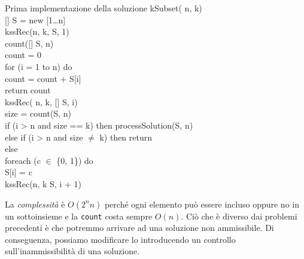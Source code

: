 \begin{minicode}{Prima implementazione della soluzione}
\ind kSubset( n,  k)\\
    [] S = new [1\dots n]\\
    kssRec(n, k, S, 1)\\

\noindent{}
\rmindent\ind{} count([] S,  n)\\
     count = 0\\
    \indf for (i = 1 to n) do\\
        count = count + S[i]\\
    \indf return count\\

\ind kssRec( n,  k, [] S,  i)\\
     size = count(S, n)\\
    \indf if (i > n and size == k) then\hfill{}
        processSolution(S, n)\\
    \indf else if (i > n and size $\neq$ k) then\hfill{}
        return\\
    \indf else\\
        \indff foreach (c $\in$ \{0, 1\}) do\\
            S[i] = c\\
            kssRec(n, k S, i + 1)
\end{minicode}

\noindent
La \emph{complessità} è $O(2^nn)$ perché ogni elemento può essere incluso oppure
no in un sottoinsieme e la \texttt{count} costa sempre $O(n)$. Ciò che è
diverso dai problemi precedenti è che potremmo arrivare ad una soluzione non
ammissibile. Di conseguenza, possiamo modificare lo 
introducendo un controllo sull'inammissibilità di una soluzione.

